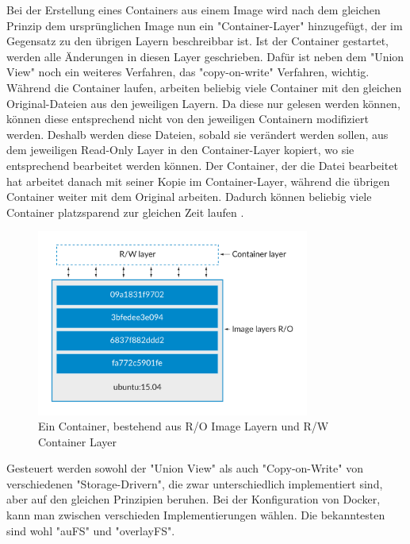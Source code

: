 \noindent Bei der Erstellung eines Containers aus einem Image wird nach dem gleichen Prinzip dem ursprünglichen Image nun ein "{}Container-Layer"{} hinzugefügt, der im Gegensatz zu den übrigen Layern beschreibbar ist. Ist der Container gestartet, werden alle Änderungen in diesen Layer geschrieben. Dafür ist neben dem "{}Union View"{} noch ein weiteres Verfahren, das "{}copy-on-write"{} Verfahren, wichtig. Während die Container laufen, arbeiten beliebig viele Container mit den gleichen Original-Dateien aus den jeweiligen Layern. Da diese nur gelesen werden können, können diese entsprechend nicht von den jeweiligen Containern modifiziert werden. Deshalb werden diese Dateien, sobald sie verändert werden sollen, aus dem jeweiligen Read-Only Layer in den Container-Layer kopiert, wo sie entsprechend bearbeitet werden können.
Der Container, der die Datei bearbeitet hat arbeitet danach mit seiner Kopie im Container-Layer, während die übrigen Container weiter mit dem Original arbeiten. Dadurch können beliebig viele Container platzsparend zur gleichen Zeit laufen \cite{docker:images}.\\

\begin{figure}[!ht]
  \centering
  \includegraphics[width=0.8\textwidth]{images/11-docker-container.png}
  \caption{Ein Container, bestehend aus R/O Image Layern und R/W Container Layer \cite{docker:images}}
\end{figure}

\noindent Gesteuert werden sowohl der "{}Union View"{} als auch "{}Copy-on-Write"{} von verschiedenen "{}Storage-Drivern"{}, die zwar unterschiedlich implementiert sind, aber auf den gleichen Prinzipien beruhen. Bei der Konfiguration von Docker, kann man zwischen verschieden Implementierungen wählen. Die bekanntesten sind wohl "{}auFS"{} und "{}overlayFS"{}.\\

